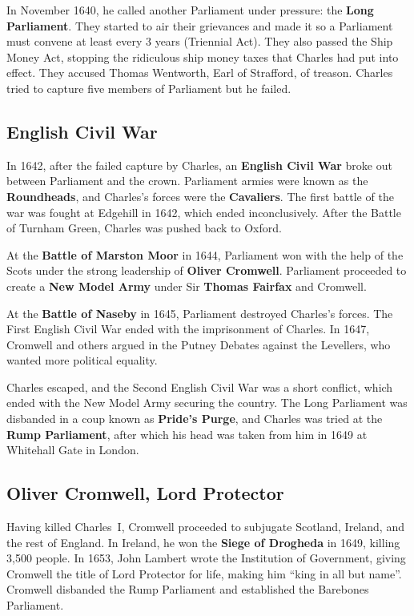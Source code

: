 In November 1640, he called another Parliament under pressure: the \textbf{Long Parliament}.
They started to air their grievances
and made it so a Parliament must convene at least every 3 years (Triennial Act).
They also passed the Ship Money Act, stopping the ridiculous ship money taxes that Charles had put into effect.
They accused Thomas Wentworth, Earl of Strafford, of treason.
Charles tried to capture five members of Parliament but he failed.

\subsection*{English Civil War}

In 1642, after the failed capture by Charles,
an \textbf{English Civil War} broke out between Parliament and the crown.
Parliament armies were known as the \textbf{Roundheads}, and Charles's forces were the \textbf{Cavaliers}.
The first battle of the war was fought at Edgehill in 1642, which ended inconclusively.
After the Battle of Turnham Green, Charles was pushed back to Oxford.

At the \textbf{Battle of Marston Moor} in 1644,
Parliament won with the help of the Scots under the strong leadership of \textbf{Oliver Cromwell}.
Parliament proceeded to create a \textbf{New Model Army} under Sir \textbf{Thomas Fairfax} and Cromwell.

At the \textbf{Battle of Naseby} in 1645, Parliament destroyed Charles's forces.
The First English Civil War ended with the imprisonment of Charles.
In 1647, Cromwell and others argued in the Putney Debates against the Levellers,
who wanted more political equality.

Charles escaped, and the Second English Civil War was a short conflict,
which ended with the New Model Army securing the country.
The Long Parliament was disbanded in a coup known as \textbf{Pride's Purge},
and Charles was tried at the \textbf{Rump Parliament},
after which his head was taken from him in 1649 at Whitehall Gate in London.

\subsection*{Oliver Cromwell, Lord Protector}

Having killed Charles~I, Cromwell proceeded to subjugate Scotland, Ireland, and the rest of England.
In Ireland, he won the \textbf{Siege of Drogheda} in 1649, killing 3,500 people.
In 1653, John Lambert wrote the Institution of Government, giving Cromwell the title of Lord Protector for life,
making him ``king in all but name''.
Cromwell disbanded the Rump Parliament and established the Barebones Parliament.


